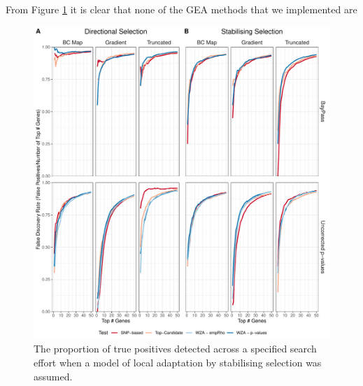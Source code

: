 \documentclass[11pt,twoside,lineno]{GSA_format}
\begin{document}
From Figure \ref{fig:falseDiscovery} it is clear that none of the GEA methods that we implemented are 


\begin{figure}[H]
  \includegraphics[width=\linewidth]{Plots/UncorrectedBayPassComparison_FalsePositives.pdf} 
  \caption{The proportion of true positives detected across a specified search effort when a model of local adaptation  by stabilising selection was assumed.}

  \label{fig:falseDiscovery}
\end{figure}
\end{document}
